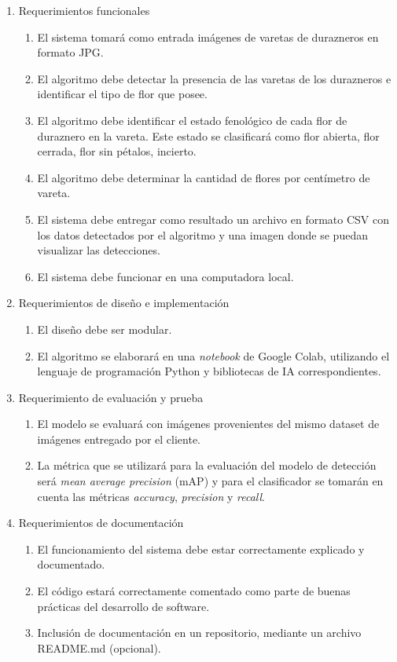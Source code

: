 \begin{enumerate}
	\item Requerimientos funcionales
		\begin{enumerate}
			\item El sistema tomará como entrada imágenes de varetas de durazneros en formato JPG.			
			\item El algoritmo debe detectar la presencia de las varetas de los durazneros e identificar el tipo de flor que posee.			        
			\item El algoritmo debe identificar el estado fenológico de cada flor de duraznero en la vareta. Este estado se clasificará como flor abierta, flor cerrada, flor sin pétalos, incierto.
			\item El algoritmo debe determinar la cantidad de flores por centímetro de vareta.
			\item El sistema debe entregar como resultado un archivo en formato CSV con los datos detectados por el algoritmo y una imagen donde se puedan visualizar las detecciones.
			\item El sistema debe funcionar en una computadora local.
		\end{enumerate}
	\item Requerimientos de diseño e implementación
		\begin{enumerate}
			\item El diseño debe ser modular.
			\item El algoritmo se elaborará en una \textit{notebook} de Google Colab, utilizando el lenguaje de  programación Python y bibliotecas de IA correspondientes. 
		\end{enumerate}
	\item Requerimiento de evaluación y prueba
	\begin{enumerate}
			\item El modelo se evaluará con imágenes provenientes del mismo dataset de imágenes entregado por el cliente.
			 \item La métrica que se utilizará para la evaluación del modelo de detección será \textit{mean average precision} (mAP) y para el clasificador se tomarán en cuenta las métricas \textit{accuracy}, \textit{precision} y \textit{recall}.
		\end{enumerate}
	\item Requerimientos de documentación
	\begin{enumerate}
			\item El funcionamiento del sistema debe estar correctamente explicado y documentado.
			 \item El código estará correctamente comentado como parte de buenas prácticas del desarrollo de software.
			 \item Inclusión de documentación en un repositorio, mediante un archivo README.md (opcional).
		\end{enumerate}
\end{enumerate}

